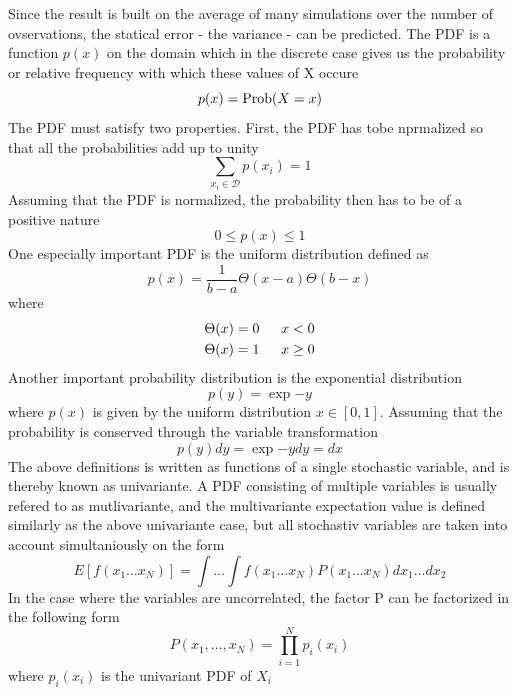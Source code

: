 \documentclass[%
reprint,
amsmath,amssymb,
aps,
]{revtex4-1}
\begin{document}
Since the result is built on the average of many simulations over the number of ovservations, the statical error - the variance - can be predicted. The PDF is a function $p(x)$ on the domain which in the discrete case gives us the probability or relative frequency with which these values of X occure 
\begin{equation}
	p(x) = \textnormal{Prob}(X=x)
\end{equation}
The PDF must satisfy two properties. First, the PDF has tobe nprmalized so that all the probabilities add up to unity
\begin{equation}
	\sum_{x_i\in \mathcal{D}} p(x_i) = 1
\end{equation} 
Assuming that the PDF is normalized, the probability then has to be of a positive nature 
\begin{equation}
	0 \leq p(x) \leq 1
\end{equation}
One especially important PDF is the uniform distribution defined as 
\begin{equation}
	p(x) = \dfrac{1}{b-a}\Theta(x-a)\Theta(b-x)
\end{equation}
where
\begin{align*}
	\Theta(x) &= 0& \hspace{2mm} x < 0\\
	\Theta(x) &= 1& \hspace{2mm} x \geq 0\\
\end{align*}
Another important probability distribution is the exponential distribution 
\begin{equation}
	p(y) = \exp{-y}
\end{equation}
where $p(x)$ is given by the uniform distribution $x\in[0,1]$. Assuming that the probability is conserved through the variable transformation
\begin{equation}
p(y)dy = \exp{-y}dy = dx
\end{equation}
The above definitions is written as functions of a single stochastic variable, and is thereby known as univariante. A PDF consisting of multiple variables is usually refered to as mutlivariante, and the multivariante expectation value is defined similarly as the above univariante case, but all stochastiv variables are taken into account simultaniously on the form
\begin{equation}
	E[f(x_1\dots x_N)] = \int\dots\int f(x_1\dots x_N)P(x_1\dots x_N)dx_1\dots dx_2
\end{equation}
In the case where the variables are uncorrelated, the factor P can be factorized in the following form
\begin{equation}
	P(x_1,\dots,x_N) = \prod_{i = 1}^{N} p_i(x_i)
\end{equation}
where $p_i(x_i)$ is the univariant PDF of $X_i$
\end{document}

